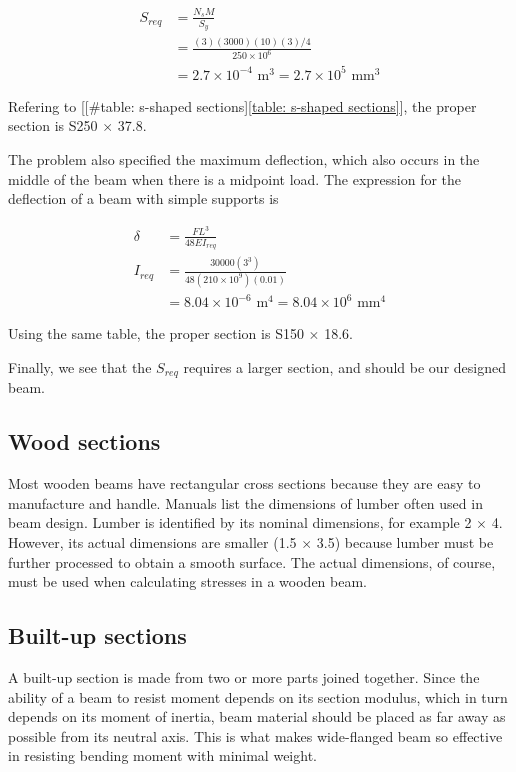 \documentclass[a4paper,openany,12pt]{book}
\begin{document}
{{$$\begin{aligned}
    S_{req} &= \frac{N_s M}{S_y} \\
            &= \frac{(3)(3000)(10)(3)/4}{250 \times 10^6} \\
            &= 2.7 \times 10^{-4} \text{ m}^3 = 2.7 \times 10^5 \text{ mm}^3
  \end{aligned}$$

Refering to [[\#table: s-shaped sections]\ref{table: s-shaped sections}],
the proper section is S250 \(\times\) 37.8.

The problem also specified the maximum deflection, which also occurs in
the middle of the beam when there is a midpoint load. The expression for
the deflection of a beam with simple supports is

$$\begin{aligned}
    \delta &= \frac{FL^3}{48EI_{req}} \\
    I_{req} &= \frac{30000(3^3)}{48(210 \times 10^9)(0.01)} \\
           &= 8.04 \times 10^{-6} \text{ m}^4 = 8.04 \times 10^6 \text{ mm}^4
  \end{aligned}$$

Using the same table, the proper section is S150 \(\times\) 18.6.

Finally, we see that the \(S_{req}\) requires a larger section, and should
be our designed beam.

\subsection{Wood sections}
\label{wood-sections}
Most wooden beams have rectangular cross sections because they are easy
to manufacture and handle. Manuals list the dimensions of lumber often
used in beam design. Lumber is identified by its nominal dimensions, for
example 2 \(\times\) 4. However, its actual dimensions are smaller (1.5
\(\times\) 3.5) because lumber must be further processed to obtain a
smooth surface. The actual dimensions, of course, must be used when
calculating stresses in a wooden beam.

\subsection{Built-up sections}
\label{built-up-sections}
A built-up section is made from two or more parts joined together. Since
the ability of a beam to resist moment depends on its section modulus,
which in turn depends on its moment of inertia, beam material should be
placed as far away as possible from its neutral axis. This is what makes
wide-flanged beam so effective in resisting bending moment with minimal
weight.

}}
\end{document}
